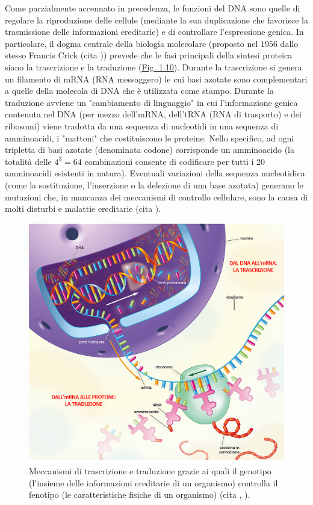 \documentclass[12pt,a4paper,twoside]{report}
\begin{document}
	Come parzialmente accennato in precedenza, le funzioni del DNA sono quelle di regolare la riproduzione delle cellule (mediante la sua duplicazione che favorisce la trasmissione delle informazioni ereditarie) e di controllare l'espressione genica. In particolare, il dogma centrale della biologia molecolare (proposto nel $1956$ dallo stesso Francis Crick (cita
	)) prevede che le fasi principali della sintesi proteica siano la trascrizione e la traduzione (\hyperref[fig:dna_rna]{Fig. 1.10}). Durante la trascrizione si genera un filamento di mRNA (RNA messaggero) le cui basi azotate sono complementari a quelle della molecola di DNA che è utilizzata come stampo. Durante la traduzione avviene un "cambiamento di linguaggio" in cui l'informazione genica contenuta nel DNA (per mezzo dell'mRNA, dell'tRNA (RNA di trasporto) e dei ribosomi) viene tradotta da una sequenza di nucleotidi in una sequenza di amminoacidi, i "mattoni" che costituiscono le proteine. Nello specifico, ad ogni tripletta di basi azotate (denominata codone) corrisponde un amminoacido (la totalità delle $4^3=64$ combinazioni consente di codificare per tutti i 20 amminoacidi esistenti in natura). Eventuali variazioni della sequenza nucleotidica (come la sostituzione, l'inserzione o la delezione di una base azotata) generano le mutazioni che, in mancanza dei meccanismi di controllo cellulare, sono la causa di molti disturbi e malattie ereditarie (cita
	).
	
	\begin{figure}[H]
		\centering
		\includegraphics[width=0.9\linewidth]{images/dna_rna.jpg}
		\caption{Meccanismi di trascrizione e traduzione grazie ai quali il genotipo (l'insieme delle informazioni ereditarie di un organismo) controlla il fenotipo (le caratteristiche fisiche di un organismo) (cita
			,
			).}
		\label{fig:dna_rna}
	\end{figure}
	
\end{document}
